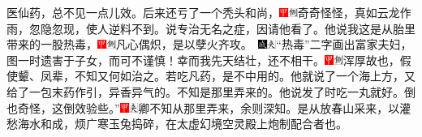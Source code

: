 医仙药，总不见一点儿效。后来还亏了一个秃头和尚，{\includegraphics[width=3mm]{../Images/00002}\includegraphics[width=3mm]{../Images/00011}\footnotesize \kaishu 奇奇怪怪，真如云龙作雨，忽隐忽现，使人逆料不到。}说专治无名之症，因请他看了。他说我这是从胎里带来的一股热毒，{{\includegraphics[width=3mm]{../Images/00002}\includegraphics[width=3mm]{../Images/00011}\footnotesize \kaishu 凡心偶炽，是以孽火齐攻。　}\includegraphics[width=3mm]{../Images/00005}\includegraphics[width=3mm]{../Images/00012}\footnotesize \kaishu “热毒”二字画出富家夫妇，图一时遗害于子女，而可不谨慎！}幸而我先天结壮，还不相干。{\includegraphics[width=3mm]{../Images/00002}\includegraphics[width=3mm]{../Images/00011}\footnotesize \kaishu 浑厚故也，假使颦、凤辈，不知又何如治之。}若吃凡药，是不中用的。他就说了一个海上方，又给了一包末药作引，异香异气的。不知是那里弄来的。他说发了时吃一丸就好。倒也奇怪，这倒效验些。”{\includegraphics[width=3mm]{../Images/00002}\includegraphics[width=3mm]{../Images/00012}\footnotesize \kaishu 卿不知从那里弄来，余则深知。是从放春山采来，以灌愁海水和成，烦广寒玉兔捣碎，在太虚幻境空灵殿上炮制配合者也。}

